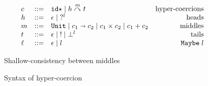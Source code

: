 \documentclass[acmsmall,review,anonymous]{acmart}\settopmatter{printfolios=true,printccs=false,printacmref=false}
\newcommand{\stxrule}[3]{#1 & ::= & #3 & \text{#2}\\}
\newcommand{\plus}[0]{+}
\newcommand{\hyperCoercionI}[0]{\mathtt{id\star}}
\newcommand{\hyperCoercionC}[3]{#1 \overset{#2}{\curvearrowright} #3}
\newcommand{\TOOdyn}[0]{\star}
\newcommand{\POOunit}[0]{\mathtt{Unit}}
\newcommand{\POOfun}[2]{#1 \shortrightarrow #2}
\newcommand{\POOprod}[2]{#1 \times #2}
\newcommand{\POOsum}[2]{#1 \plus #2}
\newcommand{\typingHC}[3]{#1 : #2 \Longrightarrow #3}
\begin{document}
\begin{figure}
	\[ 
	\begin{array}{lclr}
	\stxrule{c}{hyper-coercions}{
		\hyperCoercionI \mid{}
		\hyperCoercionC{h}{m}{t}
	}
	\stxrule{h}{heads}{
		\epsilon \mid{}
		?^l
	}
	\stxrule{m}{middles}{
		\POOunit \mid
		\POOfun{c_1}{c_2} \mid
		\POOprod{c_1}{c_2} \mid
		\POOsum{c_1}{c_2}
	}
	\stxrule{t}{tails}{
		\epsilon \mid{}
		! \mid{}
		\bot^l
	}
	\stxrule{\ell}{$ \mathtt{Maybe} \; l $}{
		\epsilon \mid{}
		l
	}
	\end{array}
	\]
	
	Shallow-consistency between middles
	
%	
%	
%	
	
	\caption{Syntax of hyper-coercion}
	\label{fig:hyper-coercion}
\end{figure}
\end{document}
